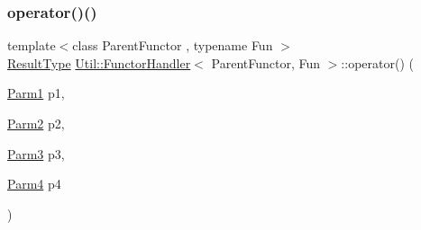 \subsubsection{\texorpdfstring{operator()()}{operator()()}\hspace{0.1cm}{\footnotesize\ttfamily [15/18]}}
{\footnotesize\ttfamily template$<$class Parent\+Functor , typename Fun $>$ \\
\mbox{\hyperlink{classUtil_1_1FunctorHandler_a036da44b8cc2567704cebd2a20d16c80}{Result\+Type}} \mbox{\hyperlink{classUtil_1_1FunctorHandler}{Util\+::\+Functor\+Handler}}$<$ Parent\+Functor, Fun $>$\+::operator() (\begin{DoxyParamCaption}\item[{\mbox{\hyperlink{classUtil_1_1FunctorHandler_a0a902ba40a0ab746f1c29a81d68ae0db}{Parm1}}}]{p1,  }\item[{\mbox{\hyperlink{classUtil_1_1FunctorHandler_a5fb5374c316f8ac252aa22fcdf7d21a7}{Parm2}}}]{p2,  }\item[{\mbox{\hyperlink{classUtil_1_1FunctorHandler_a25f1b9dd7890c1dbc68abc686f30bec8}{Parm3}}}]{p3,  }\item[{\mbox{\hyperlink{classUtil_1_1FunctorHandler_a2e8ca7556b379684e9b76029e77dd644}{Parm4}}}]{p4 }\end{DoxyParamCaption})\hspace{0.3cm}{\ttfamily [inline]}}

\mbox{\label{classUtil_1_1FunctorHandler_ac1478c707a9427b018db933037331564}} 
